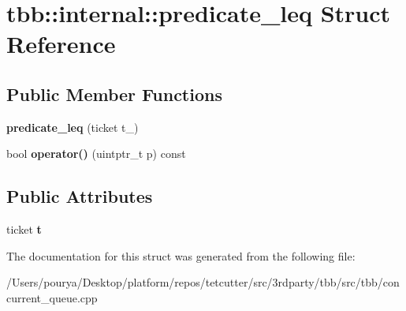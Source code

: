 \hypertarget{structtbb_1_1internal_1_1predicate__leq}{}\section{tbb\+:\+:internal\+:\+:predicate\+\_\+leq Struct Reference}
\label{structtbb_1_1internal_1_1predicate__leq}
\subsection*{Public Member Functions}
\begin{DoxyCompactItemize}
\item 
\hypertarget{structtbb_1_1internal_1_1predicate__leq_a0dead2e3249ad951dd9c75c28b77d3c9}{}{\bfseries predicate\+\_\+leq} (ticket t\+\_\+)\label{structtbb_1_1internal_1_1predicate__leq_a0dead2e3249ad951dd9c75c28b77d3c9}

\item 
\hypertarget{structtbb_1_1internal_1_1predicate__leq_a26c8154394f1536c68b971e7cac0885f}{}bool {\bfseries operator()} (uintptr\+\_\+t p) const \label{structtbb_1_1internal_1_1predicate__leq_a26c8154394f1536c68b971e7cac0885f}

\end{DoxyCompactItemize}
\subsection*{Public Attributes}
\begin{DoxyCompactItemize}
\item 
\hypertarget{structtbb_1_1internal_1_1predicate__leq_ae6ea06e6ae08dc6bc08af17734ac2bad}{}ticket {\bfseries t}\label{structtbb_1_1internal_1_1predicate__leq_ae6ea06e6ae08dc6bc08af17734ac2bad}

\end{DoxyCompactItemize}


The documentation for this struct was generated from the following file\+:\begin{DoxyCompactItemize}
\item 
/\+Users/pourya/\+Desktop/platform/repos/tetcutter/src/3rdparty/tbb/src/tbb/concurrent\+\_\+queue.\+cpp\end{DoxyCompactItemize}
